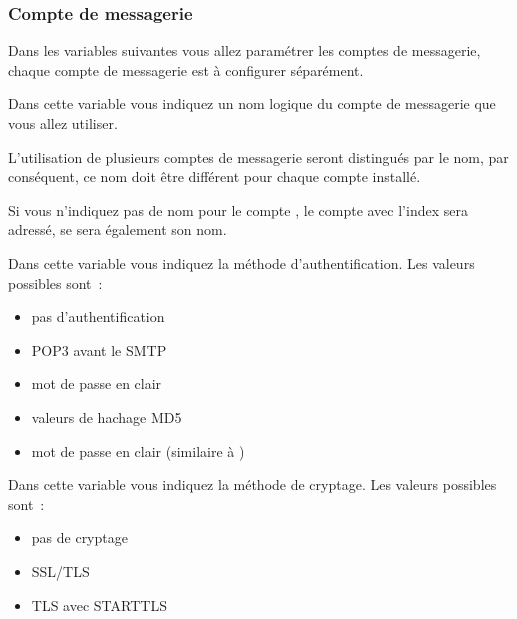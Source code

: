 \subsubsection {Compte de messagerie}

    Dans les variables suivantes vous allez paramétrer les comptes de messagerie, chaque
	compte de messagerie est à configurer séparément.

\begin {description}


    Dans cette variable vous indiquez un nom logique du compte de messagerie que vous
	allez utiliser.

	L'utilisation de plusieurs comptes de messagerie seront distingués par le nom,
	par conséquent, ce nom doit être différent pour chaque compte installé.

	Si vous n'indiquez pas de nom pour le compte , le compte avec
	l'index  sera adressé, se sera également son nom.


    Dans cette variable vous indiquez la méthode d'authentification.
	Les valeurs possibles sont~:

    \begin {itemize}
      \item [\var{'none'}] pas d'authentification
      \item [\var{'pop'}] POP3 avant le SMTP
      \item [\var{'plain'}] mot de passe en clair
      \item [\var{'cram-md5'}] valeurs de hachage MD5
      \item [\var{'login'}] mot de passe en clair (similaire à )
    \end {itemize}


    Dans cette variable vous indiquez la méthode de cryptage.
	Les valeurs possibles sont~:

    \begin {itemize}
      \item [\var{'none'}] pas de cryptage
      \item [\var{'TLS'}] SSL/TLS
      \item [\var{'STARTTLS'}] TLS avec STARTTLS
    \end {itemize}


\end{description}
